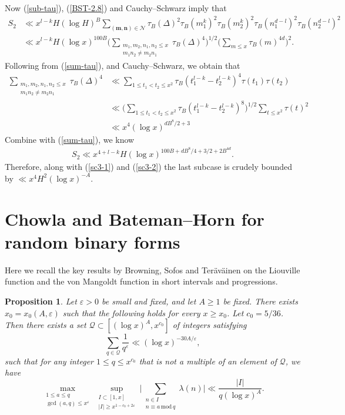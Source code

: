 \documentclass[reqno, 11pt]{amsart}
\renewcommand{\leq}{\leqslant}
\renewcommand{\geq}{\geqslant}
\newtheorem{Prop}[theorem]{Proposition}
\theoremstyle{definition}
\theoremstyle{definition}
\renewcommand{\geq}{\geqslant}
\renewcommand{\leq}{\leqslant}
\renewcommand{\mod}{\mathrm{mod}\,}
\newcommand{\eps}{\varepsilon}
\newcommand{\mm}{\mathbf{m}}
\newcommand{\nn}{\mathbf{n}}
\numberwithin{equation}{section}
\begin{document}
Now (\ref{sub-tau}), (\ref{BST-2.8}) and Cauchy--Schwarz imply that 
\begin{align*}
    S_2 & \ll x^{l-k} H (\log H)^B \sum_{(\mm,\nn) \in \mathcal{N}} \tau_B(\Delta)^2 \tau_B(m_1^k)^2 \tau_B(m_2^k)^2 \tau_B(n_1^{d-l})^2 \tau_B(n_2^{d-l})^2 \\
    & \ll x^{l-k} H (\log x)^{100B} \Big( \sum_{\substack{m_1,m_2,n_1,n_2 \leq x \\ m_1n_2 \neq m_2n_1}} \tau_B(\Delta)^4 \Big)^{1/2} \Big( \sum_{m \leq x} \tau_B(m)^{4d} \Big)^{2}. 
\end{align*}
Following from (\ref{sum-tau}), \cite[Lemma 2.9]{BST} and Cauchy--Schwarz, we obtain that
\begin{align*}
    \sum_{\substack{m_1,m_2,n_1,n_2 \leq x \\ m_1n_2 \neq m_2n_1}} \tau_B(\Delta)^4 & \ll \sum_{1 \leq t_1 < t_2 \leq x^2} \tau_B(t_1^{l-k} - t_2^{l-k})^4 \tau(t_1) \tau(t_2) \\
    & \ll \Big( \sum_{1 \leq t_1 < t_2 \leq x^2} \tau_B(t_1^{l-k} - t_2^{l-k})^8 \Big)^{1/2} \sum_{t \leq x^2} \tau(t)^2 \\
    & \ll x^4 (\log x)^{dB^8/2 + 3}
\end{align*}
Combine with (\ref{sum-tau}), we know
\begin{align*}
    S_2 \ll x^{4+l-k} H (\log x)^{100B + dB^8/4 + 3/2 + 2 B^{4d}}.
\end{align*}
Therefore, along with (\ref{sc3-1}) and (\ref{sc3-2}) the last subcase is crudely bounded by $\ll x^4 H^2 (\log x)^{-A}$.




\section{Chowla and Bateman--Horn for random binary forms}

Here we recall the key results by Browning, Sofos and Ter\"av\"ainen \cite[Proposition 3.1, Proposition 3.2]{BST} on the Liouville function and the von Mangoldt function in short intervals and progressions.

\begin{Prop}\label{prop_Liouville}
	Let $\eps > 0$ be small and fixed, and let $A \geq 1$ be fixed. There exists $x_0=x_0(A,\eps)$ such that the following holds for every $x \geq x_0$. Let $c_0 = 5/36$. Then there exists a set $\mathcal{Q} \subset [(\log x)^A, x^{c_0}]$ of integers satisfying
	\begin{equation}\label{smallQ-Liou}
		\sum_{q \in \mathcal{Q}} \frac{1}{q^{\eps}} \ll (\log x)^{-30A / \eps},
	\end{equation}
	such that for any integer $1 \leq q \leq x^{c_0}$ that is not a multiple of an element of $\mathcal{Q}$, we have 
	\begin{equation}
		\max_{\substack{1 \leq a \leq q \\ \gcd(a, q) \leq x^{\eps}}} \sup_{\substack{I \subset [1, x] \\ |I| \geq x^{1-c_0+2\eps} }} \Bigg| \sum_{\substack{n \in I \\ n \equiv a \, \mod q}} \lambda(n) \Bigg| \ll \frac{|I|}{q (\log x)^A}.
	\end{equation}
\end{Prop}
\end{document}
